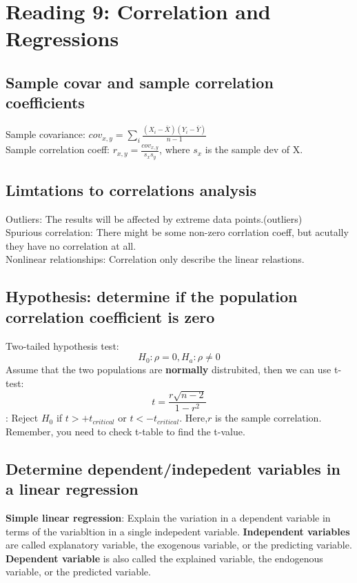 \documentclass{article}
\begin{document}
\tableofcontents

\section{Reading 9: Correlation and Regressions}
\subsection{Sample covar and sample correlation coefficients}
Sample covariance: $cov_{x,y}=\sum_i \frac{(X_i-\bar X)(Y_i-\bar Y)}{n-1}$
\\Sample correlation coeff: 
$r_{x,y}=\frac{cov_{x,y}}{s_x s_y}$, where $s_x$ is the sample dev of X.
\subsection{Limtations to correlations analysis}
Outliers: The results will be affected by extreme data points.(outliers)\\
Spurious correlation: There might be some non-zero corrlation coeff, but 
acutally they have no correlation at all.\\
Nonlinear relationships: Correlation only describe the linear relastions.
\subsection{Hypothesis: determine if the population 
correlation coefficient is zero}
Two-tailed hypothesis test:
$$
H_0: \rho=0, H_a: \rho \neq 0
$$
Assume that the two populations are {\bf normally} distrubited, then we 
can use t-test:
$$
t=\frac{r\sqrt{n-2}}{1-r^2}
$$:
Reject $H_0$ if  $t>+t_{critical}$ or $t<-t_{critical}$. Here,$r$ is the
sample correlation. Remember, you need to check t-table to find the t-value.
\subsection{Determine dependent/indepedent variables in a linear regression}
{\bf Simple linear regression}: Explain the variation in a dependent variable 
in terms of the variabltion in a single indepedent variable.
{\bf Independent variables} are called explanatory variable, the exogenous 
variable, or the predicting variable. 
{\bf Dependent variable} is also called the explained variable, the endogenous 
variable, or the predicted variable.
\end{document}
